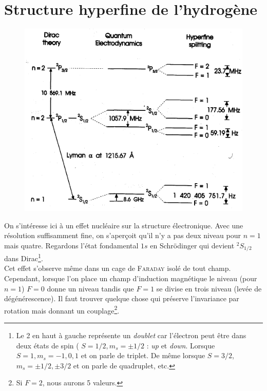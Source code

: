 \newpage
\section{Structure hyperfine de l'hydrogène}
	\begin{figure}
	\vspace{-5mm}
	\includegraphics[scale=0.5]{ch1/image11}
	\end{figure}
On s'intéresse ici à un effet nucléaire sur la structure électronique. Avec une résolution 
suffisamment fine, on s'aperçoit qu'il n'y a pas deux niveau pour $n=1$ mais quatre. Regardons
l'état fondamental $1s$ en Schrödinger qui devient $^2S_{1/2}$ dans Dirac\footnote{Le 2 en haut à 
gauche représente un \textit{doublet} car l'électron peut être dans deux états de spin (
$S=1/2, m_s =\pm1/2$ : \textit{up} et \textit{down}. Lorsque $S=1, m_s=-1,0,1$ et on parle de triplet.
De même lorsque $S=3/2$, $m_s = \pm 1/2, \pm 3/2$ et on parle de quadruplet, etc. }. \\

Cet effet s'observe même dans un cage de \textsc{Faraday} isolé de tout champ. Cependant, lorsque
l'on place un champ d'induction magnétique le niveau (pour $n=1$) $F=0$ donne un niveau tandis que
$F=1$ se divise en trois niveau (levée de dégénérescence). Il faut trouver quelque chose qui 
préserve l'invariance par rotation mais donnant un couplage\footnote{Si $F=2$, nous aurons 5 
valeurs.}. \\


